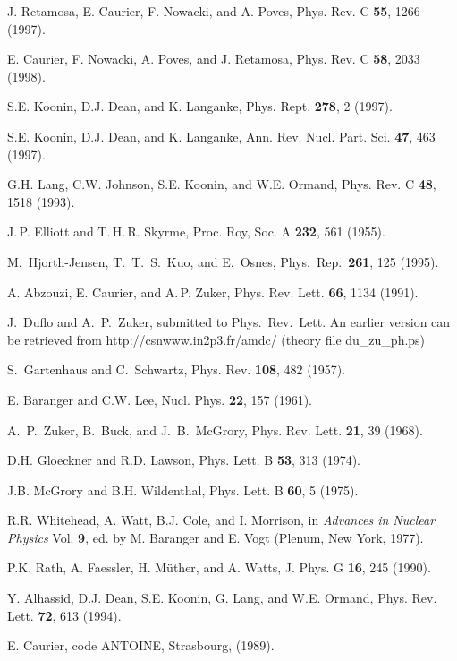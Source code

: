 \begin{multicols}{2}
\begin{references}
 J. Retamosa, E. Caurier, F. Nowacki, and A. Poves,
Phys. Rev. C {\bf 55}, 1266 (1997).

 E. Caurier, F. Nowacki, A. Poves, and J. Retamosa,
Phys. Rev. C {\bf 58}, 2033 (1998).

 S.E. Koonin, D.J. Dean, and K. Langanke,
Phys. Rept. {\bf 278}, 2 (1997).

 S.E. Koonin, D.J. Dean, and K. Langanke,
Ann. Rev. Nucl. Part. Sci. {\bf 47}, 463 (1997).

 G.H. Lang, C.W. Johnson, S.E. Koonin, and W.E. Ormand,
Phys. Rev. C {\bf 48}, 1518 (1993).

 J.\,P. Elliott and T.\,H.\,R. Skyrme, Proc. Roy,
  Soc. A {\bf 232}, 561 (1955).

 M.\ Hjorth-Jensen, T.\ T.\ S.\ Kuo, and E.\ Osnes,
Phys.\ Rep.\ {\bf 261}, 125 (1995).

 A. Abzouzi, E. Caurier, and A.\,P. Zuker, Phys.  Rev.
  Lett.  {\bf 66}, 1134 (1991).

 J.\ Duflo and A.\ P.\ Zuker, submitted to Phys.\ Rev.\ Lett.
An earlier version can be retrieved from http://csnwww.in2p3.fr/amdc/
  (theory file du\_zu\_ph.ps)

 S.\ Gartenhaus and C.\ Schwartz, Phys. Rev. {\bf 108},
  482 (1957).

 E. Baranger and C.W. Lee, Nucl. Phys. {\bf 22}, 157
(1961).

 A.\ P.\ Zuker, B.\ Buck, and J.\ B.\ McGrory,
  Phys. Rev. Lett. {\bf 21}, 39 (1968).

 D.H. Gloeckner and R.D. Lawson, Phys. Lett. B
{\bf 53}, 313 (1974).

 J.B. McGrory and B.H. Wildenthal, Phys. Lett. B
{\bf 60}, 5 (1975).

 R.R. Whitehead, A. Watt, B.J. Cole, and I.
Morrison, in {\it Advances in Nuclear Physics} Vol. {\bf 9},
ed. by M. Baranger and E. Vogt (Plenum, New York, 1977).

 P.K. Rath, A. Faessler, H. M\"uther, and A. Watts,
J. Phys. G {\bf 16}, 245 (1990).

 Y. Alhassid, D.J. Dean, S.E. Koonin, G. Lang, and
W.E. Ormand, Phys. Rev. Lett. {\bf 72}, 613 (1994).

 E. Caurier, code ANTOINE, Strasbourg, (1989).


\end{references}
\end{multicols}
